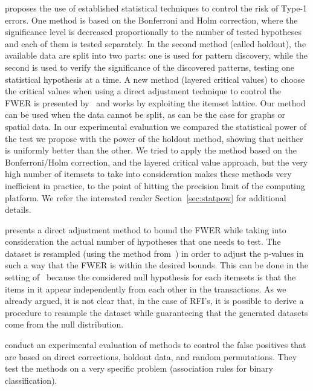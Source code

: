 \citet{Webb07} proposes the use of established statistical techniques to
control the risk of Type-1 errors. One method is based on the Bonferroni and
Holm correction, where the significance level is decreased proportionally to the
number of tested hypotheses and each of them is tested separately. In the second
method (called holdout), the available data are split into two parts: one is
used for pattern discovery, while the second is used to verify the significance
of the discovered patterns, testing one statistical hypothesis at a time. A new
method (layered critical values) to choose the critical values when using a
direct adjustment technique to control the FWER is presented by~\citet{Webb08}
and works by exploiting the itemset lattice. Our method can be used when the
data cannot be split, as can be the case for graphs or spatial data. In our
experimental evaluation we compared the statistical power of the test we propose
with the power of the holdout method, showing that neither is uniformly better
than the other. We tried to apply the method based on the Bonferroni/Holm
correction, and the layered critical value approach, but the very high number of
itemsets to take into consideration makes these methods very inefficient in
practice, to the point of hitting the precision limit of the computing platform.
We refer the interested reader Section~\ref{sec:statpow} for additional details.

\citet{Hanhijarvi11} presents a direct adjustment method to bound
the FWER while taking into consideration the actual number of hypotheses that
one needs to test. The dataset is resampled (using the method
from~\citep{GionisMMT07}) in order to adjust the
p-values in such a way that the FWER is within the desired bounds. 
This can be done in the setting of~\citep{Hanhijarvi11}
because the considered null hypothesis for each itemsets is that the
items in it appear independently from each other in the transactions.
 As we already
argued, it is not clear that, in the case of RFI's, it is possible to derive a
procedure to resample the dataset while guaranteeing that the generated datasets
come from the null distribution.

\citet{LiuZW11} conduct an experimental evaluation of methods to
control the false positives that are based on direct corrections, holdout data,
and random permutations. They test the methods on a very specific problem
(association rules for binary classification). 

